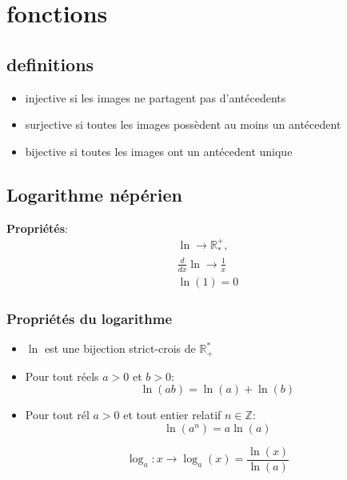 \section{fonctions}
	\subsection{definitions}
		\begin{itemize}
			\item injective si les images ne partagent pas d'ant\'ecedents
			\item surjective si toutes les images poss\`edent au moins un ant\'ecedent
			\item bijective si toutes les images ont un ant\'ecedent unique
		\end{itemize}
	\subsection{Logarithme n\'ep\'erien}
	\textbf{Propri\'et\'es}: \\
	\begin{align*}
		\ln \rightarrow \mathbb{R}^+_*,\\
		\frac{d}{dx}\ln \rightarrow \frac{1}{x}\\
		\ln(1) = 0
	\end{align*}
	\subsubsection{Propri\'et\'es du logarithme}
		\begin{itemize}
			\item $\ln$ est une bijection strict-crois de $\mathbb{R}_+^*$
			\item Pour tout r\'eels $a>0$ et $b>0$:
			\begin{equation*}
   				\ln(ab) = \ln(a)+\ln(b)	
   			\end{equation*}
		\item Pour tout r\'el $a>0$ et tout entier relatif $n \in \mathbb{Z}$:
		\begin{equation*}
			\ln(a^n)=a\ln(a)
    		\end{equation*}
			
		\end{itemize}
	
		\begin{definition}
		\begin{equation}
			\log_a:x \rightarrow\log_a(x)=\frac{\ln(x)}{\ln(a)}
  		\end{equation}
	\end{definition}
